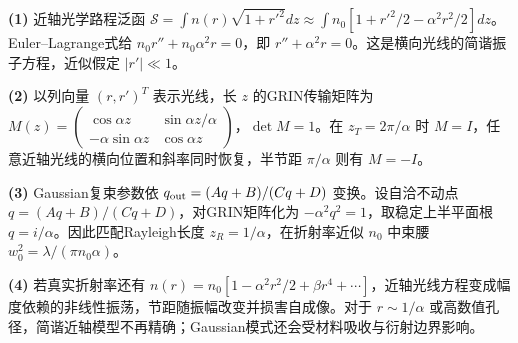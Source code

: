\par\noindent\textbf{(1)} 近轴光学路程泛函 \(\mathcal S=\int n(r)\sqrt{1+r'^2}dz\approx\int n_0[1+r'^2/2-\alpha^2r^2/2]dz\)。Euler–Lagrange式给 \(n_0r''+n_0\alpha^2r=0\)，即 \(r''+\alpha^2r=0\)。这是横向光线的简谐振子方程，近似假定 \(|r'|\ll1\)。
\par\noindent\textbf{(2)} 以列向量 \((r,r')^T\) 表示光线，长 \(z\) 的GRIN传输矩阵为 \(M(z)=\begin{pmatrix}\cos\alpha z&\sin\alpha z/\alpha\\-\alpha\sin\alpha z&\cos\alpha z\end{pmatrix}\)，\(\det M=1\)。在 \(z_T=2\pi/\alpha\) 时 \(M=I\)，任意近轴光线的横向位置和斜率同时恢复，半节距 \(\pi/\alpha\) 则有 \(M=-I\)。
\par\noindent\textbf{(3)} Gaussian复束参数依 \(q_{\rm out}=(Aq+B)/(Cq+D)\) 变换。设自洽不动点 \(q=(Aq+B)/(Cq+D)\)，对GRIN矩阵化为 \(-\alpha^2q^2=1\)，取稳定上半平面根 \(q=i/\alpha\)。因此匹配Rayleigh长度 \(z_R=1/\alpha\)，在折射率近似 \(n_0\) 中束腰 \(w_0^2=\lambda/(\pi n_0\alpha)\)。
\par\noindent\textbf{(4)} 若真实折射率还有 \(n(r)=n_0[1-\alpha^2r^2/2+\beta r^4+\cdots]\)，近轴光线方程变成幅度依赖的非线性振荡，节距随振幅改变并损害自成像。对于 \(r\sim1/\alpha\) 或高数值孔径，简谐近轴模型不再精确；Gaussian模式还会受材料吸收与衍射边界影响。
